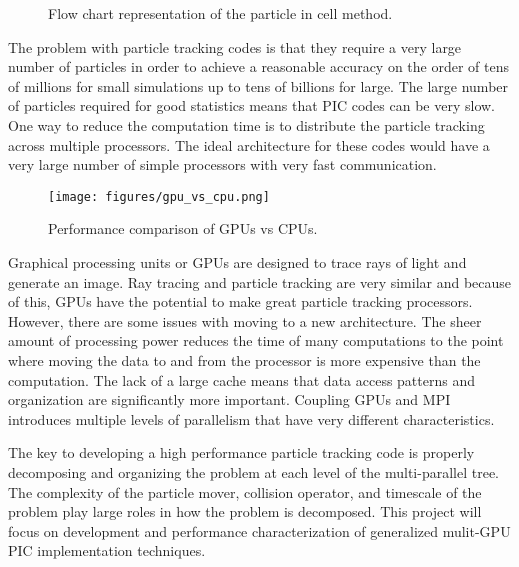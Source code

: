 \documentclass[12pt]{article} %
\begin{document}
\begin{figure}[h]
\begin{center}

\end{center}
\caption{Flow chart representation of the particle in cell method.}
\label{fig:pic_flowchart_parallel}
\end{figure}

The problem with particle tracking codes is that they require a very large number of particles in order to achieve a reasonable accuracy on the order of tens of millions for small simulations up to tens of billions for large. The large number of particles required for good statistics means that PIC codes can be very slow. One way to reduce the computation time is to distribute the particle tracking across multiple processors. The ideal architecture for these codes would have a very large number of simple processors with very fast communication.

\begin{wrapfigure}{r}{0.5\textwidth}
\begin{center}
\texttt{[image: figures/gpu\_vs\_cpu.png]}
\end{center}
\caption{Performance comparison of GPUs vs CPUs.}
\label{fig:gpu_vs_cpy}
\end{wrapfigure}

Graphical processing units or GPUs are designed to trace rays of light and generate an image. Ray tracing and particle tracking are very similar and because of this, GPUs have the potential to make great particle tracking processors. However, there are some issues with moving to a new architecture. The sheer amount of processing power reduces the time of many computations to the point where moving the data to and from the processor is more expensive than the computation.  The lack of a large cache means that data access patterns and organization are significantly more important. Coupling GPUs and MPI introduces multiple levels of parallelism that have very different characteristics.

The key to developing a high performance particle tracking code is properly decomposing and organizing the problem at each level of the multi-parallel tree. The complexity of the particle mover, collision operator, and timescale of the problem play large roles in how the problem is decomposed. This project will focus on development and performance characterization of generalized mulit-GPU PIC implementation techniques.
\end{document}
